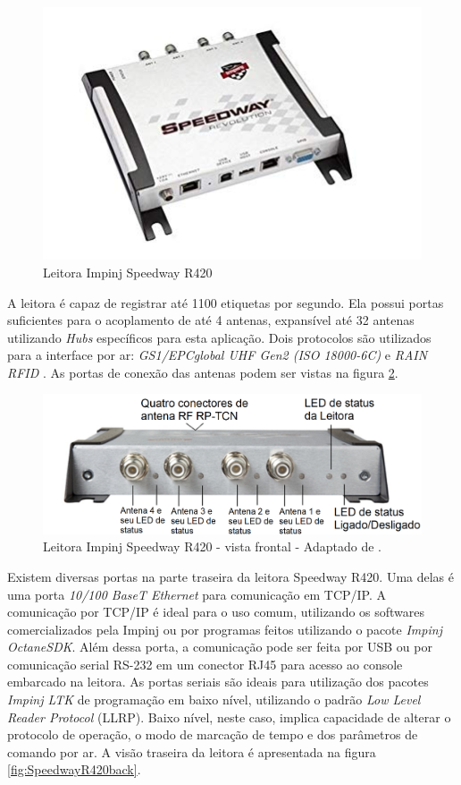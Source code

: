     \begin{figure}[h]
        \centering
        \includegraphics[width=0.8\linewidth]{figs/Metodologia/leitoraSpeedwayR420.jpg}
        \caption{Leitora Impinj Speedway R420 \cite{SpeedwayRUserManual}}
        \label{fig:SpeedwayR420_first}
    \end{figure}

 A leitora é capaz de registrar até 1100 etiquetas por segundo. Ela possui portas suficientes para o acoplamento de até 4 antenas, expansível até 32 antenas utilizando \textit{Hubs} específicos para esta aplicação. Dois protocolos são utilizados para a interface por ar: \textit{GS1/EPCglobal UHF Gen2 (ISO 18000-6C)} e \textit{RAIN RFID} \cite{SpeedwayRDatasheet}\cite{SpeedwayRUserManual}. As portas de conexão das antenas podem ser vistas na figura \ref{fig:SpeedwayR420front}.
 
     \begin{figure}[h]
        \centering
        \includegraphics[width=0.8\linewidth]{figs/Metodologia/SpeedwayR420-front-view.png}
        \caption{Leitora Impinj Speedway R420 - vista frontal - Adaptado de \cite{SpeedwayRUserManual}.}
        \label{fig:SpeedwayR420front}
    \end{figure}
 
 Existem diversas portas na parte traseira da leitora Speedway R420. Uma delas é uma porta \textit{10/100 BaseT Ethernet} para comunicação em TCP/IP. A comunicação por TCP/IP é ideal para o uso comum, utilizando os softwares comercializados pela Impinj ou por programas feitos utilizando o pacote \textit{Impinj OctaneSDK}. Além dessa porta, a comunicação pode ser feita por USB ou por comunicação serial RS-232 em um conector RJ45 para acesso ao console embarcado na leitora. As portas seriais são ideais para utilização dos pacotes \textit{Impinj LTK} de programação em baixo nível, utilizando o padrão \textit{Low Level Reader Protocol} (LLRP). Baixo nível, neste caso, implica capacidade de alterar o protocolo de operação, o modo de marcação de tempo e dos parâmetros de comando por ar\cite{GS1-LLRP}\cite{SpeedwayRUserManual}. A visão traseira da leitora é apresentada na figura \ref{fig:SpeedwayR420back}.
 
